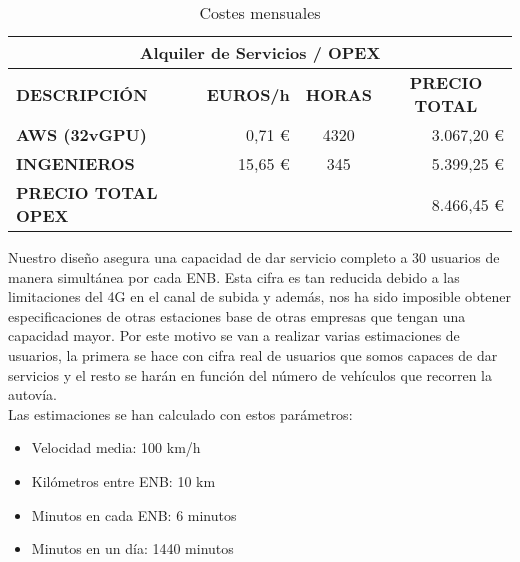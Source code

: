\begin{table}[H]
\centering
\begin{tabular}{|lrcr|}
\hline
\multicolumn{4}{|c|}{\textbf{Alquiler de Servicios / OPEX}}                                                                                                                 \\ \hline
\multicolumn{1}{|l|}{\textbf{DESCRIPCIÓN}}       & \multicolumn{1}{c|}{\textbf{EUROS/h}} & \multicolumn{1}{c|}{\textbf{HORAS}} & \multicolumn{1}{c|}{\textbf{PRECIO TOTAL}} \\ \hline
\multicolumn{1}{|l|}{\textbf{AWS (32vGPU)}}      & \multicolumn{1}{r|}{0,71 \euro}        & \multicolumn{1}{c|}{4320}           & 3.067,20 \euro                              \\ \hline
\multicolumn{1}{|l|}{\textbf{INGENIEROS}}        & \multicolumn{1}{r|}{15,65 \euro}       & \multicolumn{1}{c|}{345}            & 5.399,25 \euro                              \\ \hline
\multicolumn{1}{|l|}{\textbf{PRECIO TOTAL OPEX}} & \multicolumn{3}{r|}{8.466,45 \euro}                                                                                       \\ \hline
\end{tabular}
\caption{Costes mensuales}
\label{hopee}
\end{table}

Nuestro diseño asegura una capacidad de dar servicio completo a 30 usuarios de manera simultánea por cada ENB. Esta cifra es tan reducida debido a las limitaciones del 4G en el canal de subida y además, nos ha sido imposible obtener especificaciones de otras estaciones base de otras empresas que tengan una capacidad mayor. Por este motivo se van a realizar varias estimaciones de usuarios, la primera se hace con cifra real de usuarios que somos capaces de dar servicios y el resto se harán en función del número de vehículos que recorren la autovía.\\

Las estimaciones se han calculado con estos parámetros:
\begin{itemize}
\item Velocidad media:	100 km/h
\item Kilómetros entre ENB:	 10 km
\item Minutos en cada ENB:	6 minutos
\item Minutos en un día: 1440 minutos
\end{itemize}

